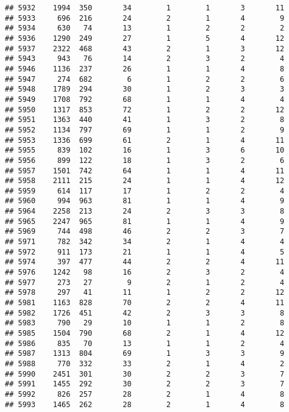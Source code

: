 \documentclass[]{article}
\begin{document}
\begin{verbatim}
## 5932    1994  350       34        1        1       3       11
## 5933     696  216       24        2        1       4        9
## 5934     630   74       13        1        2       2        2
## 5936    1290  249       27        1        5       4       12
## 5937    2322  468       43        2        1       3       12
## 5943     943   76       14        2        3       2        4
## 5946    1136  237       26        1        1       4        8
## 5947     274  682        6        1        2       2        6
## 5948    1789  294       30        1        2       3        3
## 5949    1708  792       68        1        1       4        4
## 5950    1317  853       72        1        2       2       12
## 5951    1363  440       41        1        3       2        8
## 5952    1134  797       69        1        1       2        9
## 5953    1336  699       61        2        1       4       11
## 5955     839  102       16        1        3       6       10
## 5956     899  122       18        1        3       2        6
## 5957    1501  742       64        1        1       4       11
## 5958    2111  215       24        1        1       4       12
## 5959     614  117       17        1        2       2        4
## 5960     994  963       81        1        1       4        9
## 5964    2258  213       24        2        3       3        8
## 5965    2247  965       81        1        1       4        9
## 5969     744  498       46        2        2       3        7
## 5971     782  342       34        2        1       4        4
## 5972     911  173       21        1        1       4        5
## 5974     397  477       44        2        2       4       11
## 5976    1242   98       16        2        3       2        4
## 5977     273   27        9        2        1       2        4
## 5978     297   41       11        1        2       2       12
## 5981    1163  828       70        2        2       4       11
## 5982    1726  451       42        2        3       3        8
## 5983     790   29       10        1        1       2        8
## 5985    1504  790       68        2        1       4       12
## 5986     835   70       13        1        1       2        4
## 5987    1313  804       69        1        3       3        9
## 5988     770  332       33        2        1       4        2
## 5990    2451  301       30        2        2       3        7
## 5991    1455  292       30        2        2       3        7
## 5992     826  257       28        2        1       4        8
## 5993    1465  262       28        2        1       4        8

\end{verbatim}
\end{document}
